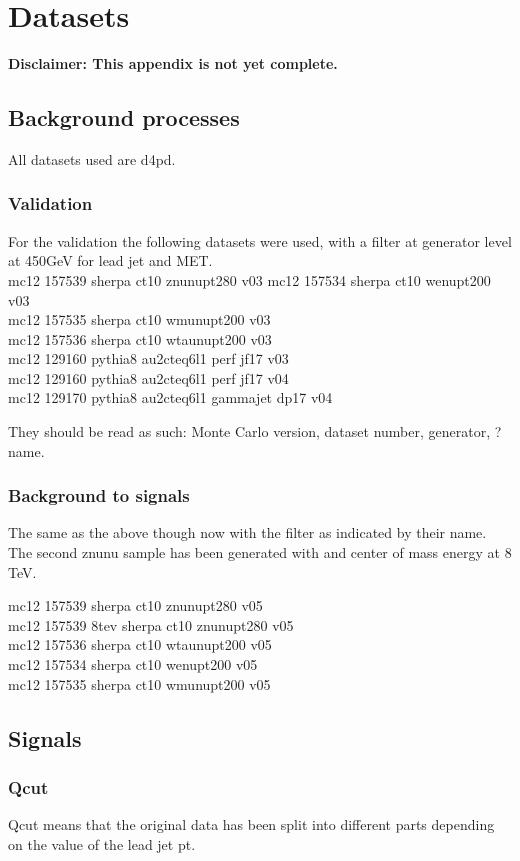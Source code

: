 \chapter{Datasets}\label{cha:datasets}
\textbf{Disclaimer: This appendix is not yet complete.}
\section{Background processes}
All datasets used are d4pd.
\subsection{Validation}
For the validation the following datasets were used, with a filter at generator level at 450GeV for lead jet and MET. \\
mc12 157539 sherpa ct10 znunupt280 v03
mc12 157534 sherpa  ct10  wenupt200 v03\\
mc12 157535 sherpa  ct10  wmunupt200 v03\\
mc12 157536 sherpa  ct10  wtaunupt200 v03\\
mc12 129160 pythia8  au2cteq6l1  perf  jf17 v03\\
mc12 129160 pythia8  au2cteq6l1  perf  jf17 v04\\
mc12 129170 pythia8  au2cteq6l1  gammajet  dp17 v04

They should be read as such: Monte Carlo version, dataset number, generator, ? name.

\subsection{Background to signals}
The same as the above though now with the filter as indicated by their name. The second znunu sample has been generated with and center of mass energy at 8 TeV. 

mc12 157539 sherpa  ct10  znunupt280 v05\\
mc12 157539 8tev  sherpa  ct10  znunupt280 v05\\
mc12 157536 sherpa  ct10  wtaunupt200 v05\\
mc12 157534 sherpa  ct10  wenupt200 v05\\
mc12 157535 sherpa  ct10  wmunupt200 v05
\section{Signals}
\subsection{Qcut}
Qcut means that the original data has been split into different parts depending on the value of the lead jet pt. 
